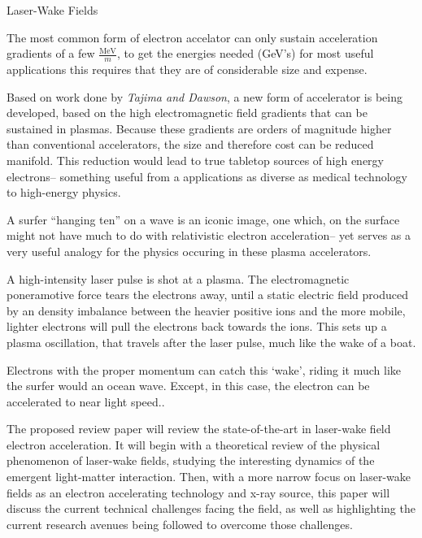 \documentclass[12pt]{article}
\begin{document}


\centerline{ \huge Laser-Wake Fields}
\bigskip

The most common form of electron accelator can only sustain acceleration gradients of a few $\frac{\textrm{MeV}}{m}$\cite{faure2004laser}, to get the energies needed (GeV's) for most useful applications this requires that they are of considerable size and expense. 
    
    Based on work done by \textit{Tajima and Dawson}\cite{PhysRevLett.43.267}, a new form of accelerator is being developed, based on the high electromagnetic field gradients that can be sustained in plasmas. Because these gradients are orders of magnitude higher than conventional accelerators, the size and therefore cost can be reduced manifold. This reduction would lead to true tabletop sources of high energy electrons-- something useful from a applications as
    diverse as medical technology to high-energy physics\cite{malka2008principles}.


A surfer ``hanging ten'' on a wave is an iconic image, one which, on the surface might not have much to do with relativistic electron acceleration-- yet serves as a very useful analogy for the physics occuring in these plasma accelerators.

A high-intensity laser pulse is shot at a plasma. The electromagnetic poneramotive force tears the electrons away, until a static electric field produced by an density imbalance between the heavier positive ions and the more mobile, lighter electrons will pull the electrons back towards the ions. This sets up a plasma oscillation, that travels after the laser pulse, much like the wake of a boat.

Electrons with the proper momentum can catch this `wake', riding it much like the surfer would an ocean wave. Except, in this case, the electron can be accelerated to near light speed.\cite{LPOR:LPOR200810062}.


The proposed review paper will review the state-of-the-art in laser-wake field electron acceleration.
It will begin with a theoretical review of the physical phenomenon of laser-wake fields, studying the interesting dynamics of the emergent light-matter interaction. Then, with a more narrow focus on laser-wake fields as an electron accelerating technology and x-ray source, this paper will discuss the current technical challenges facing the field, as well as highlighting the current research
avenues being followed to overcome those challenges.

\end{document}
